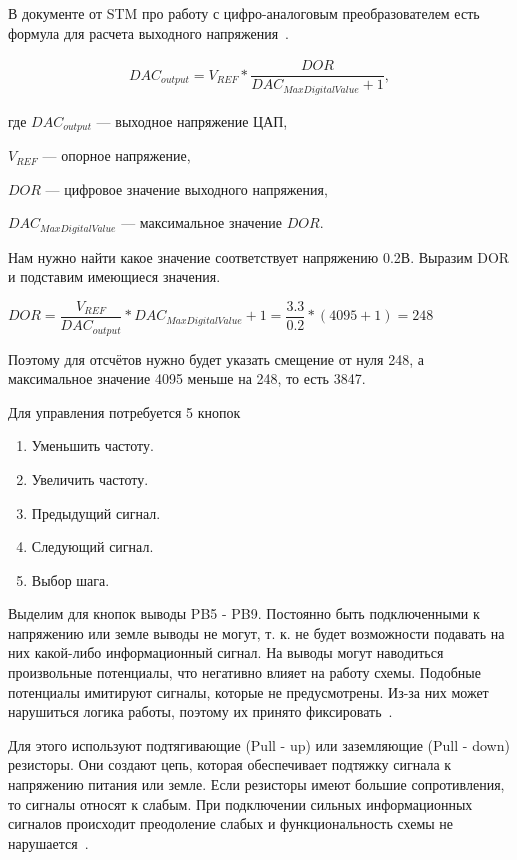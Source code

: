 	В документе от STM про работу с цифро-аналоговым преобразователем есть формула для расчета выходного напряжения~\cite{an3126}.
	
	\begin{gather}
	DAC_{output} = V_{REF}*\dfrac{DOR}{DAC_{MaxDigitalValue} + 1},
	\end{gather}
	
	где $DAC_{output}$ --- выходное напряжение ЦАП,
	
	$V_{REF}$ --- опорное напряжение,
	
	$DOR$ --- цифровое значение выходного напряжения,
	
	$DAC_{MaxDigitalValue}$ --- максимальное значение $DOR$.
	
	Нам нужно найти какое значение соответствует напряжению 0.2В. Выразим DOR и подставим имеющиеся значения.
	
	\begin{center}
	$DOR = \dfrac{V_{REF}}{DAC_{output}}*DAC_{MaxDigitalValue} + 1 = \dfrac{3.3}{0.2}*(4095+1) = 248$
	\end{center}
	
	Поэтому для отсчётов нужно будет указать смещение от нуля 248, а максимальное значение 4095 меньше на 248, то есть 3847. 
	
	Для управления потребуется 5 кнопок
	\begin{enumerate}
		\item Уменьшить частоту.
		\item Увеличить частоту.
		\item Предыдущий сигнал.
		\item Следующий сигнал.
		\item Выбор шага.
	\end{enumerate}
	
	Выделим для кнопок выводы PB5 - PB9. Постоянно быть подключенными к напряжению или земле выводы не могут, т. к. не будет возможности подавать на них какой-либо информационный сигнал. На выводы могут наводиться произвольные потенциалы, что негативно влияет на работу схемы. Подобные потенциалы имитируют сигналы, которые не предусмотрены. Из-за них может нарушиться логика работы, поэтому их принято фиксировать~\cite{schemat}. 
	
	Для этого используют подтягивающие (Pull - up) или заземляющие (Pull - down) резисторы. Они создают цепь, которая обеспечивает подтяжку сигнала к напряжению питания или земле. Если резисторы имеют большие сопротивления, то сигналы относят к слабым. При подключении сильных информационных сигналов происходит преодоление слабых и функциональность схемы не нарушается~\cite{butres}.
	

